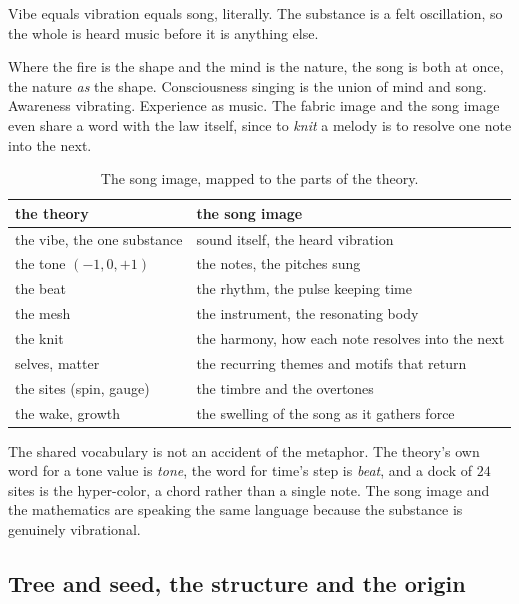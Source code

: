 \begin{principle}
Vibe equals vibration equals song, literally. The substance is a felt oscillation, so the whole is heard music before it is anything else.
\end{principle}

Where the fire is the shape and the mind is the nature, the song is both at once, the nature \emph{as} the shape. Consciousness singing is the union of mind and song. Awareness vibrating. Experience as music. The fabric image and the song image even share a word with the law itself, since to \emph{knit} a melody is to resolve one note into the next.

\begin{table}[ht]
\centering
\begin{tabular}{@{}ll@{}}
\toprule
the theory & the song image \\
\midrule
the vibe, the one substance & sound itself, the heard vibration \\
the tone $(-1, 0, +1)$ & the notes, the pitches sung \\
the beat & the rhythm, the pulse keeping time \\
the mesh & the instrument, the resonating body \\
the knit & the harmony, how each note resolves into the next \\
selves, matter & the recurring themes and motifs that return \\
the sites (spin, gauge) & the timbre and the overtones \\
the wake, growth & the swelling of the song as it gathers force \\
\bottomrule
\end{tabular}
\caption{The song image, mapped to the parts of the theory.}
\label{tab:song-image}
\end{table}

The shared vocabulary is not an accident of the metaphor. The theory's own word for a tone value is \emph{tone}, the word for time's step is \emph{beat}, and a dock of $24$ sites is the hyper-color, a chord rather than a single note. The song image and the mathematics are speaking the same language because the substance is genuinely vibrational.

\subsection{Tree and seed, the structure and the origin}

